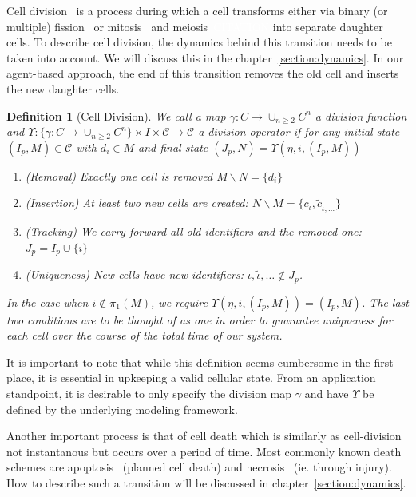 \documentclass{article}
\newcommand{\todo}[1]{\colorbox{WildStrawberry}{\textcolor{white}{#1}}}
\newtheorem{definition}{Definition}[section]
\begin{document}
Cell division~\cite{bhlitem268752} is a process during which a cell transforms either via binary
(or multiple) fission~\cite{Biov2014} or mitosis~\cite{Ilowiecki1981,von1835resp} and
meiosis~\todo{CITATION} into separate
daughter cells.
To describe cell division, the dynamics behind this transition needs to be taken into account.
We will discuss this in the chapter~\ref{section:dynamics}.
In our agent-based approach, the end of this transition removes the old cell and inserts the new
daughter cells.

\begin{definition}[Cell Division]
    \label{definition:cell-division}
    We call a map $\gamma:C\rightarrow \cup_{n\geq 2}C^n$ a division function and
    $\Upsilon:\{\gamma:C\rightarrow \cup_{n\geq 2}C^n\}\times I\times\mathscr{C}\rightarrow\mathscr{C}$ a 
    division operator if for any initial state $(I_p,M)\in\mathscr{C}$ with $d_i\in M$ and final
    state $(J_p,N)=\Upsilon(\eta,i,(I_p,M))$
    \begin{enumerate}
        \item (Removal) Exactly one cell is removed $M\backslash N=\{d_i\}$
        \item (Insertion) At least two new cells are created:
            $N\backslash M=\{c_\iota,\tilde{c}_{\tilde{\iota},\dots}\}$
        \item (Tracking) We carry forward all old identifiers and the removed one: $J_p=I_p\cup\{i\}$
        \item (Uniqueness) New cells have new identifiers: $\iota,\tilde{\iota},\dots\notin J_p$.
    \end{enumerate}
    In the case when $i\notin\pi_1(M)$, we require $\Upsilon(\eta,i,(I_p,M))=(I_p,M)$.
    The last two conditions are to be thought of as one in order to guarantee uniqueness for each
    cell over the course of the total time of our system.
\end{definition}

It is important to note that while this definition seems cumbersome in the first place, it is
essential in upkeeping a valid cellular state.
From an application standpoint, it is desirable to only specify the division map $\gamma$ and have
$\Upsilon$ be defined by the underlying modeling framework.

Another important process is that of cell death which is similarly as cell-division not instantanous
but occurs over a period of time.
Most commonly known death schemes are apoptosis~\cite{Kerr1965} (planned cell death) and
necrosis~\cite{Gerschenson2001} (ie. through injury).
How to describe such a transition will be discussed in chapter~\ref{section:dynamics}.
\end{document}

